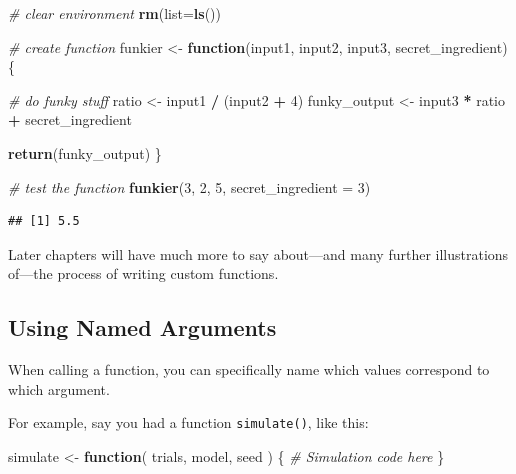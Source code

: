 \documentclass[
]{book}
\newenvironment{Shaded}{\begin{snugshade}}{\end{snugshade}}
\newcommand{\AttributeTok}[1]{\textcolor[rgb]{0.13,0.29,0.53}{#1}}
\newcommand{\CommentTok}[1]{\textcolor[rgb]{0.56,0.35,0.01}{\textit{#1}}}
\newcommand{\ControlFlowTok}[1]{\textcolor[rgb]{0.13,0.29,0.53}{\textbf{#1}}}
\newcommand{\DecValTok}[1]{\textcolor[rgb]{0.00,0.00,0.81}{#1}}
\newcommand{\FunctionTok}[1]{\textcolor[rgb]{0.13,0.29,0.53}{\textbf{#1}}}
\newcommand{\NormalTok}[1]{#1}
\newcommand{\OtherTok}[1]{\textcolor[rgb]{0.56,0.35,0.01}{#1}}
\newcommand{\SpecialCharTok}[1]{\textcolor[rgb]{0.81,0.36,0.00}{\textbf{#1}}}
\begin{document}
\begin{Shaded}
\begin{Highlighting}[]
\CommentTok{\# clear environment}
\FunctionTok{rm}\NormalTok{(}\AttributeTok{list=}\FunctionTok{ls}\NormalTok{()) }

\CommentTok{\# create function}
\NormalTok{funkier }\OtherTok{\textless{}{-}} \ControlFlowTok{function}\NormalTok{(input1, input2, input3, secret\_ingredient) \{}
  
  \CommentTok{\# do funky stuff}
\NormalTok{  ratio }\OtherTok{\textless{}{-}}\NormalTok{ input1 }\SpecialCharTok{/}\NormalTok{ (input2 }\SpecialCharTok{+} \DecValTok{4}\NormalTok{)}
\NormalTok{  funky\_output }\OtherTok{\textless{}{-}}\NormalTok{ input3 }\SpecialCharTok{*}\NormalTok{ ratio }\SpecialCharTok{+}\NormalTok{ secret\_ingredient}
  
  \FunctionTok{return}\NormalTok{(funky\_output)  }
\NormalTok{\}}


\CommentTok{\# test the function}
\FunctionTok{funkier}\NormalTok{(}\DecValTok{3}\NormalTok{, }\DecValTok{2}\NormalTok{, }\DecValTok{5}\NormalTok{, }\AttributeTok{secret\_ingredient =} \DecValTok{3}\NormalTok{)}
\end{Highlighting}
\end{Shaded}

\begin{verbatim}
## [1] 5.5
\end{verbatim}

Later chapters will have much more to say about---and many further illustrations of---the process of writing custom functions.

\subsection{Using Named Arguments}\label{using-named-arguments}

When calling a function, you can specifically name which values correspond to which argument.

For example, say you had a function \texttt{simulate()}, like this:

\begin{Shaded}
\begin{Highlighting}[]
\NormalTok{simulate }\OtherTok{\textless{}{-}} \ControlFlowTok{function}\NormalTok{( trials, model, seed ) \{}
  \CommentTok{\# Simulation code here}
\NormalTok{\}}
\end{Highlighting}
\end{Shaded}
\end{document}
